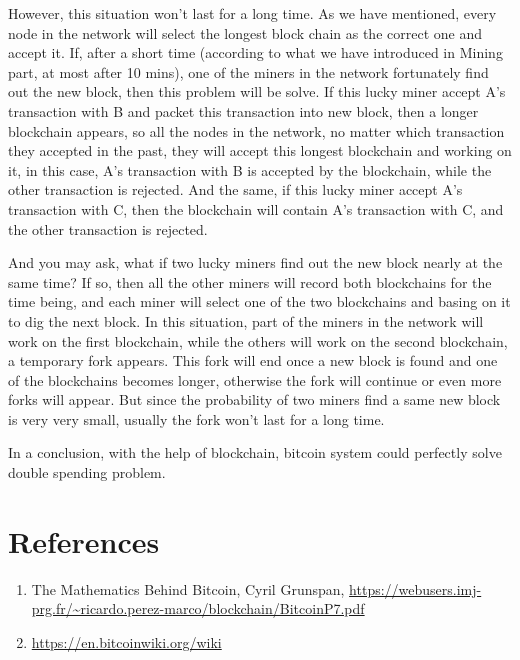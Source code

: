 \documentclass[12pt,a4paper]{article}
\begin{document}
 However, this situation won't last for a long time. As we have mentioned, every node in the network will select the longest block chain as the correct one and accept it. If, after a short time (according to what we have introduced in Mining part, at most after 10 mins), one of the miners in the network fortunately find out the new block, then this problem will be solve. If this lucky miner accept A's transaction with B and packet this transaction into new block, then a longer blockchain appears, so all the nodes in the network, no matter which transaction they accepted in the past, they will accept this longest blockchain and working on it, in this case, A's transaction with B is accepted by the blockchain, while the other transaction is rejected. And the same, if this lucky miner accept A's transaction with C, then the blockchain will contain A's transaction with C, and the other transaction is rejected.
 
 And you may ask, what if two lucky miners find out the new block nearly at the same time? If so, then all the other miners will record both blockchains for the time being, and each miner will select one of the two blockchains and basing on it to dig the next block. In this situation, part of the miners in the network will work on the first blockchain, while the others will work on the second blockchain, a temporary fork appears. This fork will end once a new block is found and one of the blockchains becomes longer, otherwise the fork will continue or even more forks will appear. But since the probability of two miners find a same new block is very very small, usually the fork won't last for a long time.
 
 In a conclusion, with the help of blockchain, bitcoin system could perfectly solve double spending problem.

\section{References}
\begin{enumerate}
	\item The Mathematics Behind Bitcoin, Cyril Grunspan, \url{https://webusers.imj-prg.fr/~ricardo.perez-marco/blockchain/BitcoinP7.pdf}
	\item \url{https://en.bitcoinwiki.org/wiki}
\end{enumerate}
\end{document}
